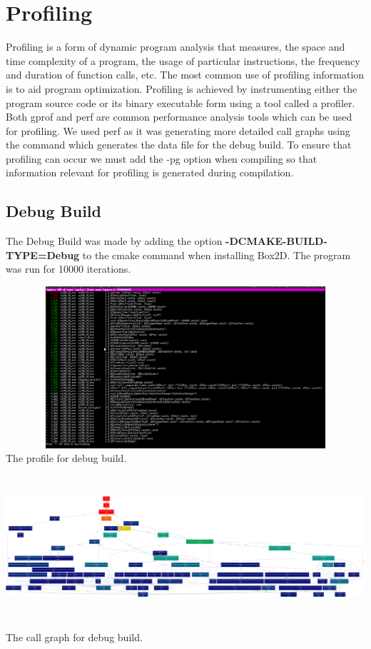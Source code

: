 \documentclass[11pt]{article}
\begin{document}
\section{Profiling}
Profiling is a form of dynamic program analysis that measures, the space and time complexity of a program, the usage of particular instructions, the frequency and duration of function calls, etc. The most common use of profiling information is to aid program optimization. Profiling is achieved by instrumenting either the program source code or its binary executable form using a tool called a profiler. Both gprof and perf are common performance analysis tools which can be used for profiling. We used perf as it was generating more detailed call graphs using the command which generates the data file for the debug build. To ensure that profiling can occur we must add the -pg option when compiling so that information relevant for profiling is generated during compilation.

\subsection{Debug Build}
The Debug Build was made by adding the option \textbf{-DCMAKE-BUILD-TYPE=Debug} to the cmake command when installing Box2D. The program was run for 10000 iterations.
\\
\begin{center}
\includegraphics[width=15cm,height = 6cm]{../images/debug.png}
The profile for debug build.
\\
\includegraphics[width=15cm,height = 6cm]{../images/debug_call_graph.png}
The call graph for debug build.
\\
\end{center}
\end{document}
